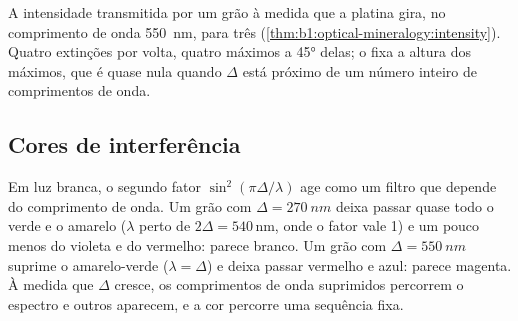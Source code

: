 \begin{omfigure}

{\small A intensidade transmitida por um grão à medida que a platina gira, no comprimento de onda \qty{550}{nm}, para três  (\cref{thm:b1:optical-mineralogy:intensity}). Quatro extinções por volta, quatro máximos a \ang{45} delas; o  fixa a altura dos máximos, que é quase nula quando $\Delta$ está próximo de um número inteiro de comprimentos de onda.}
\end{omfigure}

\subsection{Cores de interferência}

Em luz branca, o segundo fator $\sin^2(\pi\Delta/\lambda)$ age como um filtro que depende do comprimento de onda. Um grão com $\Delta = \qty{270}{nm}$ deixa passar quase todo o verde e o amarelo ($\lambda$ perto de $2\Delta = 540$\,nm, onde o fator vale 1) e um pouco menos do violeta e do vermelho: parece branco. Um grão com $\Delta = \qty{550}{nm}$ suprime o amarelo-verde ($\lambda = \Delta$) e deixa passar vermelho e azul: parece magenta. À medida que $\Delta$ cresce, os comprimentos de onda suprimidos percorrem o espectro e outros aparecem, e a cor percorre uma sequência fixa.

